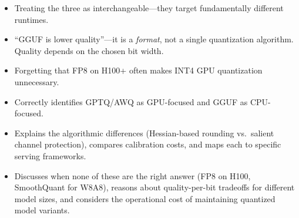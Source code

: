 \begin{interviewq}
\redflags
\begin{itemize}
    \item Treating the three as interchangeable---they target fundamentally different runtimes.
    \item ``GGUF is lower quality''---it is a \textit{format}, not a single quantization algorithm. Quality depends on the chosen bit width.
    \item Forgetting that FP8 on H100+ often makes INT4 GPU quantization unnecessary.
\end{itemize}


\goodgreat
\begin{itemize}
    \item {} Correctly identifies GPTQ/AWQ as GPU-focused and GGUF as CPU-focused.
    \item {} Explains the algorithmic differences (Hessian-based rounding vs.\ salient channel protection), compares calibration costs, and maps each to specific serving frameworks.
    \item {} Discusses when none of these are the right answer (FP8 on H100, SmoothQuant for W8A8), reasons about quality-per-bit tradeoffs for different model sizes, and considers the operational cost of maintaining quantized model variants.
\end{itemize}

\end{interviewq}


